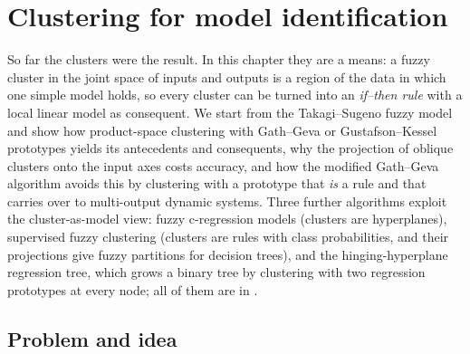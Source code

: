 \chapter{Clustering for model identification}\label{ch:models}
\begin{roadmap}
So far the clusters were the result. In this chapter they are a means: a fuzzy cluster in the joint space of inputs and outputs is a region of the data in which one simple model holds, so every cluster can be turned into an \emph{if--then rule} with a local linear model as consequent. We start from the Takagi--Sugeno fuzzy model and show how product-space clustering with Gath--Geva or Gustafson--Kessel prototypes yields its antecedents and consequents, why the projection of oblique clusters onto the input axes costs accuracy, and how the modified Gath--Geva algorithm avoids this by clustering with a prototype that \emph{is} a rule and that carries over to multi-output dynamic systems. Three further algorithms exploit the cluster-as-model view: fuzzy c-regression models (clusters are hyperplanes), supervised fuzzy clustering (clusters are rules with class probabilities, and their projections give fuzzy partitions for decision trees), and the hinging-hyperplane regression tree, which grows a binary tree by clustering with two regression prototypes at every node; all of them are in .
\end{roadmap}

\section{Problem and idea}\label{sec:models:problem}

